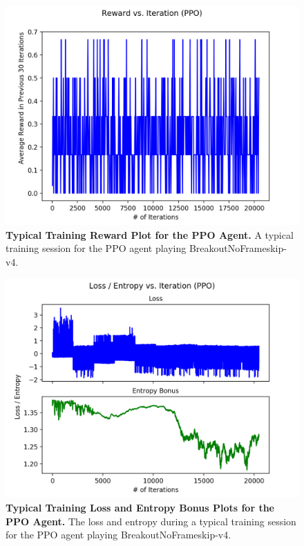 \documentclass[conference]{IEEEtran}
\begin{document}
\begin{figure}[htbp]
\centerline{\includegraphics[scale=0.5]{PPO_Train_Reward_Plot_Breakout_Typical.png}}
\caption{\textbf{Typical Training Reward Plot for the PPO Agent.}  A typical training session for the PPO agent playing BreakoutNoFrameskip-v4.}
\label{fig:PPOTypicalTrainRewardBreakout}
\end{figure}

\begin{figure}[htbp]
\centerline{\includegraphics[scale=0.5]{PPO_Train_Loss_Entropy_Plot_Breakout_Typical.png}}
\caption{\textbf{Typical Training Loss and Entropy Bonus Plots for the PPO Agent.}  The loss and entropy during a typical training session for the PPO agent playing BreakoutNoFrameskip-v4.}
\label{fig:PPOTypicalTrainLossEntropyBreakout}
\end{figure}
\end{document}

